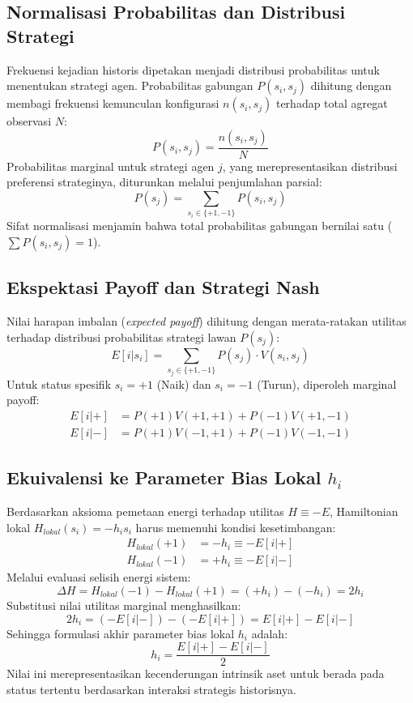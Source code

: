 \subsection{Normalisasi Probabilitas dan Distribusi Strategi}
Frekuensi kejadian historis dipetakan menjadi distribusi probabilitas untuk menentukan strategi agen. Probabilitas gabungan $P(s_i, s_j)$ dihitung dengan membagi frekuensi kemunculan konfigurasi $n(s_i, s_j)$ terhadap total agregat observasi $N$:
\begin{equation}
P(s_i, s_j) = \frac{n(s_i, s_j)}{N}
\end{equation}
Probabilitas marginal untuk strategi agen $j$, yang merepresentasikan distribusi preferensi strateginya, diturunkan melalui penjumlahan parsial:
\begin{equation}
P(s_j) = \sum_{s_i \in \{+1, -1\}} P(s_i, s_j)
\end{equation}
Sifat normalisasi menjamin bahwa total probabilitas gabungan bernilai satu ($\sum P(s_i, s_j) = 1$).

\subsection{Ekspektasi Payoff dan Strategi Nash}
Nilai harapan imbalan (\textit{expected payoff}) dihitung dengan merata-ratakan utilitas terhadap distribusi probabilitas strategi lawan $P(s_j)$:
\begin{equation}
E[i|s_i] = \sum_{s_j \in \{+1, -1\}} P(s_j) \cdot V(s_i, s_j)
\end{equation}
Untuk status spesifik $s_i = +1$ (Naik) dan $s_i = -1$ (Turun), diperoleh marginal payoff:
\begin{align}
E[i|+] &= P(+1)V(+1,+1) + P(-1)V(+1,-1) \\
E[i|-] &= P(+1)V(-1,+1) + P(-1)V(-1,-1)
\end{align}

\subsection{Ekuivalensi ke Parameter Bias Lokal $h_i$}
Berdasarkan aksioma pemetaan energi terhadap utilitas $H \equiv -E$, Hamiltonian lokal $H_{lokal}(s_i) = -h_i s_i$ harus memenuhi kondisi kesetimbangan:
\begin{align}
H_{lokal}(+1) &= -h_i \equiv -E[i|+] \\
H_{lokal}(-1) &= +h_i \equiv -E[i|-]
\end{align}
Melalui evaluasi selisih energi sistem:
\begin{equation}
\Delta H = H_{lokal}(-1) - H_{lokal}(+1) = (+h_i) - (-h_i) = 2h_i
\end{equation}
Substitusi nilai utilitas marginal menghasilkan:
\begin{equation}
2h_i = (-E[i|-]) - (-E[i|+]) = E[i|+] - E[i|-]
\end{equation}
Sehingga formulasi akhir parameter bias lokal $h_i$ adalah:
\begin{equation}
h_i = \frac{E[i|+] - E[i|-]}{2}
\end{equation}
Nilai ini merepresentasikan kecenderungan intrinsik aset untuk berada pada status tertentu berdasarkan interaksi strategis historisnya.
